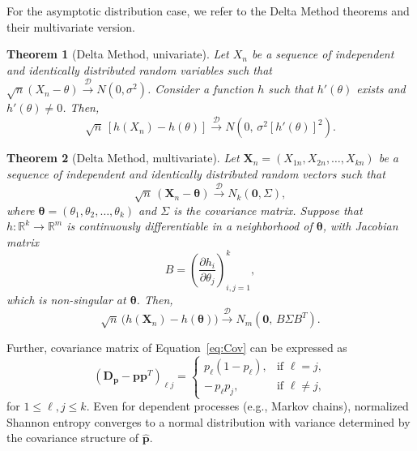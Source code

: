 For the asymptotic distribution case, we refer to the Delta Method theorems and their multivariate version.

\theoremstyle{plain}
\newtheorem{theorem}{Theorem}

\begin{theorem}[Delta Method, univariate]
	Let $X_n$ be a sequence of independent and identically distributed random variables such that 
	$\sqrt{n}(X_n - \theta) \xrightarrow{\mathscr{D}} N(0,\sigma^2)$. 
	Consider a function $h$ such that $h'(\theta)$ exists and $h'(\theta)\neq 0$. 
	Then,
	\[
	\sqrt{n}\,[h(X_n)-h(\theta)] \xrightarrow{\mathscr{D}} N\!\left(0,\,\sigma^2 [h'(\theta)]^2\right).
	\]
\end{theorem}

\begin{theorem}[Delta Method, multivariate]
	Let $\mathbf{X}_n= (X_{1n}, X_{2n}, \dots, X_{kn})$ be a sequence of independent and identically distributed random vectors such that 
	\[
	\sqrt{n}\,(\mathbf{X}_n - \boldsymbol{\theta}) \xrightarrow{\mathscr{D}} N_k(\mathbf{0},\Sigma),
	\]
	where $\boldsymbol{\theta} = (\theta_1,\theta_2,\dots,\theta_k)$ and $\Sigma$ is the covariance matrix. 
	Suppose that $h:\mathbb{R}^k \to \mathbb{R}^m$ is continuously differentiable in a neighborhood of $\boldsymbol{\theta}$, with Jacobian matrix
	\[
	B = \left( \frac{\partial h_i}{\partial \theta_j} \right)_{i,j=1}^k,
	\]
	which is non-singular at $\boldsymbol{\theta}$. Then,
	\[
	\sqrt{n}\,\big(h(\mathbf{X}_n)-h(\boldsymbol{\theta})\big) \xrightarrow{\mathscr{D}} N_m\!\left(\mathbf{0},\, B \Sigma B^T\right).
	\]
\end{theorem}

Further, covariance matrix of Equation~\eqref{eq:Cov} can be expressed as 
\begin{equation}
	(\mathbf{D_p}-\mathbf{pp}^T)_{\ell j} =
	\begin{cases}
		p_{\ell}(1-p_{\ell}), & \text{if } \ell = j, \\[6pt]
		-\,p_{\ell}p_{j}, & \text{if } \ell \neq j,
	\end{cases}
\end{equation}
for $1\leq {\ell}, j\leq k.$
Even for dependent processes (e.g., Markov chains), normalized Shannon entropy converges to a normal distribution with variance determined by the covariance structure of $\widehat{\mathbf{p}}$. 

